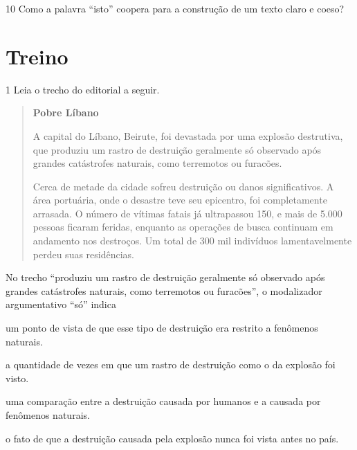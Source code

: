 \num{10} Como a palavra ``isto'' coopera para a construção de um texto
claro e coeso?


\section{Treino}

\num{1} Leia o trecho do editorial a seguir.

\begin{quote}
\textbf{Pobre Líbano}

A capital do Líbano, Beirute, foi devastada por uma explosão destrutiva,
que produziu um rastro de destruição geralmente só observado após
grandes catástrofes naturais, como terremotos ou furacões.

Cerca de metade da cidade sofreu destruição ou danos significativos. A
área portuária, onde o desastre teve seu epicentro, foi completamente
arrasada. O número de vítimas fatais já ultrapassou 150, e mais de 5.000
pessoas ficaram feridas, enquanto as operações de busca continuam em
andamento nos destroços. Um total de 300 mil indivíduos lamentavelmente
perdeu suas residências.

\end{quote}

No trecho ``produziu um rastro de destruição geralmente só observado
após grandes catástrofes naturais, como terremotos ou furacões'', o
modalizador argumentativo ``só'' indica

\begin{escolha}
\item um ponto de vista de que esse tipo de destruição era restrito a
fenômenos naturais.

\item a quantidade de vezes em que um rastro de destruição como o da
explosão foi visto.

\item uma comparação entre a destruição causada por humanos e a causada
por fenômenos naturais.

\item o fato de que a destruição causada pela explosão nunca foi vista
antes no país.
\end{escolha}

